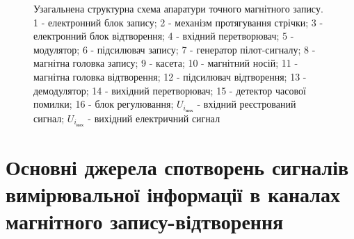 \documentclass[a4paper,14pt]{extreport}
\begin{document}
    \begin{figure}[h]
        \caption{Узагальнена структурна схема апаратури точного магнітного запису.\\ 1 - електронний блок запису; 2 - механізм протягування стрічки;
        3 - електронний блок відтворення; 4 - вхідний перетворювач;
        5 - модулятор; 6 - підсилювач запису; 7 - генератор пілот-сигналу;      8 - магнітна головка запису; 9 - касета; 10 - магнітний носій;      11 - магнітна головка відтворення; 12 - підсилювач відтворення;      13 - демодулятор; 14 - вихідний перетворювач; 15 - детектор часової помилки; 16 - блок регулювання; $U_{i_{\text{вих}}}$ - вхідний реєстрований сигнал; $U_{i_{\text{вих}}}$ - вихідний електричний сигнал}
      \label{ris3}
    \end{figure}

\chapter{Основні джерела спотворень сигналів вимірювальної інформації в каналах магнітного запису-відтворення}\par
\end{document}
